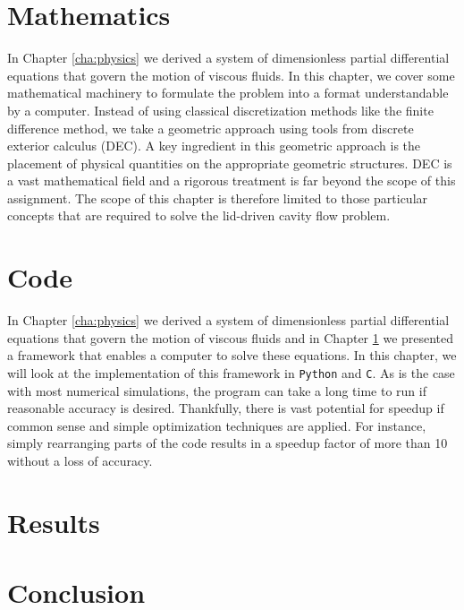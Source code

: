 \documentclass[a4paper, 11pt, toc=bibliography, parskip=half]{scrreprt}
\begin{document}



\chapter{Mathematics}
\label{cha:mathematics}

In Chapter \ref{cha:physics} we derived a system of dimensionless partial differential equations that govern the motion of viscous fluids. In this chapter, we cover some mathematical machinery to formulate the problem into a format understandable by a computer. Instead of using classical discretization methods like the finite difference method, we take a geometric approach using tools from discrete exterior calculus (DEC). A key ingredient in this geometric approach is the placement of physical quantities on the appropriate geometric structures. DEC is a vast mathematical field and a rigorous treatment is far beyond the scope of this assignment. The scope of this chapter is therefore limited to those particular concepts that are required to solve the lid-driven cavity flow problem.







\chapter{Code}
\label{cha:code}

In Chapter \ref{cha:physics} we derived a system of dimensionless partial differential equations that govern the motion of viscous fluids and in Chapter \ref{cha:mathematics} we presented a framework that enables a computer to solve these equations. In this chapter, we will look at the implementation of this framework in \texttt{Python} and \texttt{C}. As is the case with most numerical simulations, the program can take a long time to run if reasonable accuracy is desired. Thankfully, there is vast potential for speedup if common sense and simple optimization techniques are applied. For instance, simply rearranging parts of the code results in a speedup factor of more than 10 without a loss of accuracy.





\chapter{Results}
\label{cha:results}



\chapter{Conclusion}
\label{cha:conclusion}



\printbibliography[heading=bibintoc, title={References}]
\end{document}
